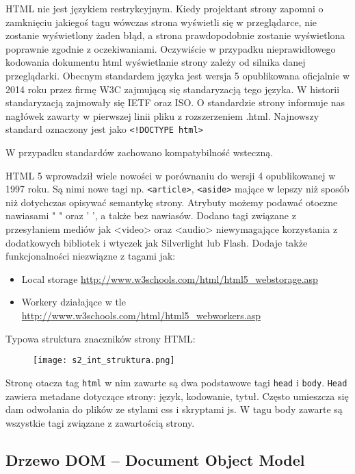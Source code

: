 HTML nie jest językiem restrykcyjnym. Kiedy projektant strony zapomni o zamknięciu jakiegoś tagu wówczas strona wyświetli się w przeglądarce, nie zostanie wyświetlony żaden błąd, a strona prawdopodobnie zostanie wyświetlona poprawnie zgodnie z oczekiwaniami. Oczywiście w przypadku nieprawidłowego kodowania dokumentu html wyświetlanie strony zależy od silnika danej przeglądarki. Obecnym standardem języka jest wersja 5 opublikowana oficjalnie w 2014 roku przez firmę W3C zajmującą się standaryzacją tego języka. W historii standaryzacją zajmowały się IETF oraz ISO. O standardzie strony informuje nas nagłówek zawarty w pierwszej linii pliku z rozszerzeniem .html. Najnowszy standard oznaczony jest jako \texttt{<!DOCTYPE html>}

W przypadku standardów zachowano kompatybilność wsteczną.

HTML 5 wprowadził wiele nowości w porównaniu do wersji 4 opublikowanej w 1997 roku. Są nimi nowe tagi np. \texttt{<article>}, \texttt{<aside>} mające w lepszy niż sposób niż dotychczas opisywać semantykę strony. Atrybuty możemy podawać otoczne nawiasami " " oraz ' ', a także bez nawiasów. Dodano tagi związane z przesyłaniem mediów jak <video> oraz <audio> niewymagające korzystania z dodatkowych bibliotek i wtyczek jak Silverlight lub Flash. Dodaje także funkcjonalności niezwiązne z tagami jak:
\begin{itemize}
\item Local storage \url{http://www.w3schools.com/html/html5_webstorage.asp}
\item Workery działające w tle \url{http://www.w3schools.com/html/html5_webworkers.asp}
\end{itemize}

Typowa struktura znaczników strony HTML:

\begin{figure}[H]
\centering
\texttt{[image: s2\_int\_struktura.png]}
\end{figure}

Stronę otacza tag \texttt{html} w nim zawarte są dwa podstawowe tagi \texttt{head} i \texttt{body}. \texttt{Head} zawiera metadane dotyczące strony: język, kodowanie, tytuł. Często umieszcza się dam odwołania do plików ze stylami css i skryptami js. W tagu body zawarte są wszystkie tagi związane z zawartością strony.

\subsection{Drzewo DOM -- Document Object Model}

